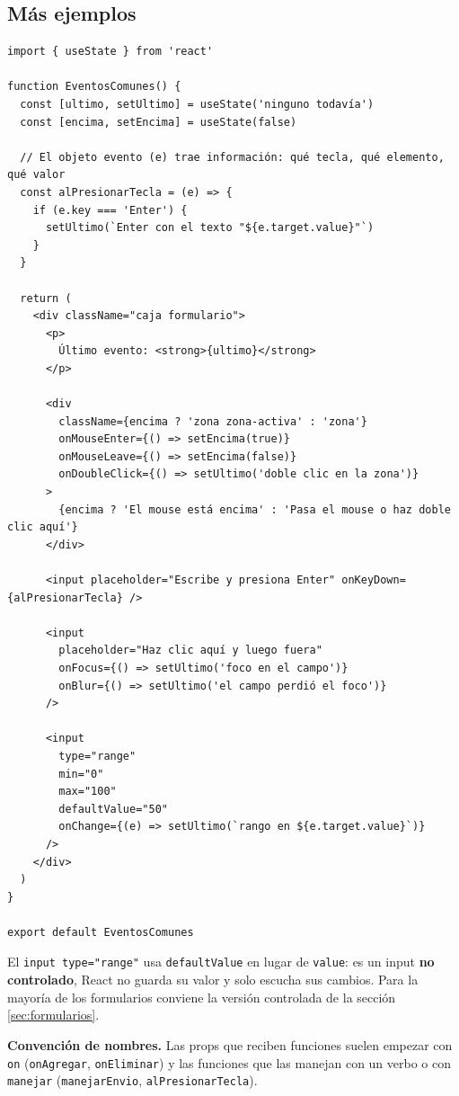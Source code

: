 \documentclass[11pt,a4paper]{article}
\newcommand{\cmd}[1]{\texttt{\color{reactdark}#1}}
\begin{document}
\subsection{Más ejemplos}

\begin{lstlisting}[language=JSX,title={\small\ttfamily src/components/eventos/EventosComunes.jsx}]
import { useState } from 'react'

function EventosComunes() {
  const [ultimo, setUltimo] = useState('ninguno todavía')
  const [encima, setEncima] = useState(false)

  // El objeto evento (e) trae información: qué tecla, qué elemento, qué valor
  const alPresionarTecla = (e) => {
    if (e.key === 'Enter') {
      setUltimo(`Enter con el texto "${e.target.value}"`)
    }
  }

  return (
    <div className="caja formulario">
      <p>
        Último evento: <strong>{ultimo}</strong>
      </p>

      <div
        className={encima ? 'zona zona-activa' : 'zona'}
        onMouseEnter={() => setEncima(true)}
        onMouseLeave={() => setEncima(false)}
        onDoubleClick={() => setUltimo('doble clic en la zona')}
      >
        {encima ? 'El mouse está encima' : 'Pasa el mouse o haz doble clic aquí'}
      </div>

      <input placeholder="Escribe y presiona Enter" onKeyDown={alPresionarTecla} />

      <input
        placeholder="Haz clic aquí y luego fuera"
        onFocus={() => setUltimo('foco en el campo')}
        onBlur={() => setUltimo('el campo perdió el foco')}
      />

      <input
        type="range"
        min="0"
        max="100"
        defaultValue="50"
        onChange={(e) => setUltimo(`rango en ${e.target.value}`)}
      />
    </div>
  )
}

export default EventosComunes
\end{lstlisting}

El \cmd{input type="range"} usa \cmd{defaultValue} en lugar de \cmd{value}: es un input \textbf{no controlado}, React no guarda su valor y solo escucha sus cambios. Para la mayoría de los formularios conviene la versión controlada de la sección \ref{sec:formularios}.

\textbf{Convención de nombres.} Las props que reciben funciones suelen empezar con \cmd{on} (\cmd{onAgregar}, \cmd{onEliminar}) y las funciones que las manejan con un verbo o con \cmd{manejar} (\cmd{manejarEnvio}, \cmd{alPresionarTecla}).
\end{document}
